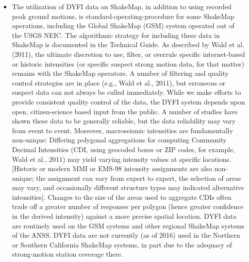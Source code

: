 \documentclass[letterpaper,10pt,english]{sphinxmanual}
\begin{document}
\begin{itemize}
\item {} 
The utilization of DYFI data on ShakeMap, in addition to using recorded peak
ground motions, is standard-operating-procedure for some ShakeMap
operations, including the Global ShakeMap (GSM) system operated out of the
USGS NEIC. The algorithmic strategy for including these data in ShakeMap is
documented in the Technical Guide. As described by Wald et al.
(2011), the ultimate discretion to use, filter, or overrule specific
internet-based or historic intensities (or specific suspect strong motion
data, for that matter) remains with the ShakeMap operators. A number of
filtering and quality control strategies are in place (e.g., Wald et al.,
2011), but erroneous or suspect data can not always be culled immediately.
While we make efforts to provide consistent quality control of the data, the
DYFI system depends upon open, citizen-science based input from the public.
A number of studies have shown these data to be generally reliable, but the
data reliability may vary from event to event. Moreover, macroseismic
intensities are fundamentally non-unique: Differing polygonal aggregations
for computing Community Decimal Intensities (CDI, using geocoded boxes or
ZIP codes, for example, Wald et al., 2011) may yield varying intensity
values at specific locations. {[}Historic or modern MMI or EMS-98 intensity
assignments are also non-unique; the assignment can vary from expert to
expert, the selection of areas may vary, and occasionally different
structure types may indicated alternative intensities{]}. Changes to the
size of the areas used to aggregate CDIs often trade off a greater number
of responses per polygon (hence greater confidence in the derived
intensity) against a more precise spatial location. DYFI data are
routinely used on the GSM systems and other regional ShakeMap systems of the
ANSS. DYFI data are not currently (as of 2016) used in the Northern or
Southern California ShakeMap systems, in part due to the adequacy of
strong-motion station coverage there.

\end{itemize}
\end{document}
